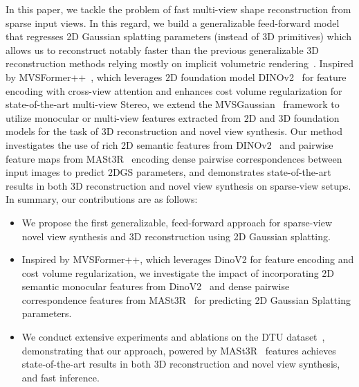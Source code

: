 In this paper, we tackle the problem of fast multi-view shape reconstruction from sparse input views. In this regard, we build a generalizable feed-forward model that regresses 2D Gaussian splatting parameters (instead of 3D primitives) which allows us to reconstruct notably faster than the previous generalizable 3D reconstruction methods  relying mostly on implicit volumetric rendering~\cite{johari2022geonerf, xu2023wavenerf, chen2021mvsnerf, ren2023volrecon, long2022sparseneus, liang2024retr, jena2024geotransfer, na2024uforecon}. Inspired by MVSFormer++~\cite{cao2024mvsformer++}, which leverages $2$D foundation model DINOv2~\cite{oquab2023dinov2} for feature encoding with cross-view attention and enhances cost volume regularization for state-of-the-art multi-view Stereo, we extend the MVSGaussian~\cite{liu2024fast} framework to utilize monocular or multi-view features extracted from $2$D and $3$D foundation models for the task of $3$D reconstruction and novel view synthesis. Our method investigates the use of rich 2D semantic features from DINOv2~\cite{oquab2023dinov2} and pairwise feature maps from MASt3R~\cite{leroy2024grounding} encoding dense pairwise correspondences between input images to predict $2$DGS parameters, and demonstrates state-of-the-art results in both $3$D reconstruction and novel view synthesis on sparse-view setups. In summary, our contributions are as follows:
\vspace{-1pt}
\begin{itemize}
\item We propose the first generalizable, feed-forward approach for sparse-view novel view synthesis and 3D reconstruction using 2D Gaussian splatting. %
\item Inspired by MVSFormer++\cite{cao2024mvsformer++}, which leverages DinoV2\cite{oquab2023dinov2} for feature encoding and cost volume regularization, we investigate the impact of incorporating 2D semantic monocular features from DinoV2~\cite{oquab2023dinov2} and dense pairwise correspondence features from MASt3R~\cite{leroy2024grounding} for predicting 2D Gaussian Splatting parameters.
\item We conduct extensive experiments and ablations on the DTU dataset~\cite{aanaes2016large}, demonstrating that our approach, powered by MASt3R~\cite{leroy2024grounding} features achieves state-of-the-art results in both 3D reconstruction and novel view synthesis, and fast inference.
\end{itemize}